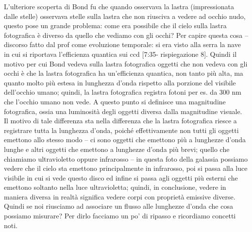 \documentclass[a4paper,11pt]{article}
\begin{document}
L’ulteriore scoperta di Bond fu che quando osservava la lastra (impressionata dalle stelle) osservava stelle sulla lastra che non riusciva a vedere ad occhio nudo, questo pose un grande problema: come era possibile che il cielo sulla lastra fotografica è diverso da quello che vediamo con gli occhi? Per capire questa cosa – discorso fatto dal prof come evoluzione temporale: si era visto alla serra la nave in cui si riportava l’efficienza quantica sui ccd [7:35- rispiegazione 8]. Quindi il motivo per cui Bond vedeva sulla lastra fotografica oggetti che non vedeva con gli occhi è che la lastra fotografica ha un’efficienza quantica, non tanto più alta, ma quanto molto più estesa in lunghezza d’onda rispetto alla porzione del visibile dell’occhio umano; quindi, la lastra fotografica registra fotoni per es. da 300 nm che l’occhio umano non vede. A questo punto si definisce  una magnitudine fotografica, ossia una luminosità degli oggetti diversa dalla magnitudine visuale. Il motivo di tale differenza sta nella differenza che la lastra fotografica riesce a registrare tutta la lunghezza d’onda, poiché effettivamente non tutti gli oggetti emettono allo stesso modo – ci sono oggetti che emettono più a lunghezze d’onda lunghe e altri oggetti che emettono a lunghezze d’onda più brevi; quello che chiamiamo ultravioletto oppure infrarosso – in questa foto della galassia possiamo vedere che il cielo sta emettono principalmente in infrarosso, poi si passa alla luce visibile in cui si vede questo disco ed infine si passa agli oggetti più esterni che emettono soltanto nella luce ultravioletta; quindi, in conclusione, vedere in maniera diversa in realtà significa vedere corpi con proprietà emissive diverse. Quindi se noi riusciamo ad associare un flusso alle lunghezze d’onda che cosa possiamo misurare? Per dirlo facciamo un po' di ripasso e ricordiamo concetti noti.
\newline
\end{document}
